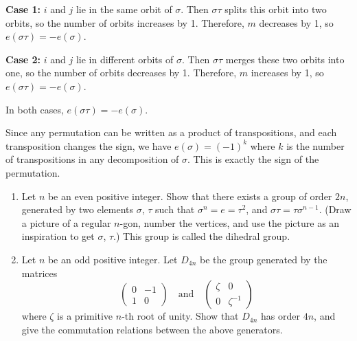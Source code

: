 \textbf{Case 1:} $i$ and $j$ lie in the same orbit of $\sigma$. Then $\sigma\tau$ splits this orbit into two orbits, so the number of orbits increases by 1. Therefore, $m$ decreases by 1, so $e(\sigma\tau) = -e(\sigma)$.

\textbf{Case 2:} $i$ and $j$ lie in different orbits of $\sigma$. Then $\sigma\tau$ merges these two orbits into one, so the number of orbits decreases by 1. Therefore, $m$ increases by 1, so $e(\sigma\tau) = -e(\sigma)$.

In both cases, $e(\sigma\tau) = -e(\sigma)$.

Since any permutation can be written as a product of transpositions, and each transposition changes the sign, we have $e(\sigma) = (-1)^k$ where $k$ is the number of transpositions in any decomposition of $\sigma$. This is exactly the sign of the permutation.

\begin{problembox}
\begin{enumerate}[label=(\alph*)]
\item Let $n$ be an even positive integer. Show that there exists a group of order $2n$, generated by two elements $\sigma$, $\tau$ such that $\sigma^n = e = \tau^2$, and $\sigma\tau = \tau\sigma^{n-1}$. (Draw a picture of a regular $n$-gon, number the vertices, and use the picture as an inspiration to get $\sigma$, $\tau$.) This group is called the dihedral group.
\item Let $n$ be an odd positive integer. Let $D_{4n}$ be the group generated by the matrices
\[\begin{pmatrix}
0 & -1 \\
1 & 0 
\end{pmatrix} \quad \text{and} \quad \begin{pmatrix}
\zeta & 0 \\
0 & \zeta^{-1}
\end{pmatrix}\]
where $\zeta$ is a primitive $n$-th root of unity. Show that $D_{4n}$ has order $4n$, and give the commutation relations between the above generators.
\end{enumerate}
\end{problembox}

